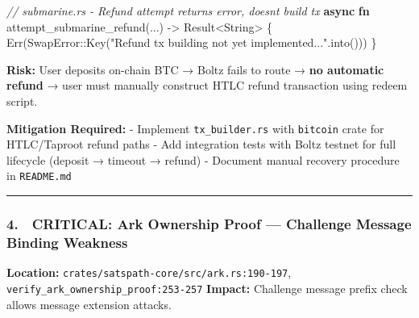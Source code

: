 \documentclass[
]{article}
\newenvironment{Shaded}{}{}
\newcommand{\CommentTok}[1]{\textcolor[rgb]{0.38,0.63,0.69}{\textit{#1}}}
\newcommand{\ConstantTok}[1]{\textcolor[rgb]{0.53,0.00,0.00}{#1}}
\newcommand{\DataTypeTok}[1]{\textcolor[rgb]{0.56,0.13,0.00}{#1}}
\newcommand{\KeywordTok}[1]{\textcolor[rgb]{0.00,0.44,0.13}{\textbf{#1}}}
\newcommand{\NormalTok}[1]{#1}
\newcommand{\OperatorTok}[1]{\textcolor[rgb]{0.40,0.40,0.40}{#1}}
\newcommand{\PreprocessorTok}[1]{\textcolor[rgb]{0.74,0.48,0.00}{#1}}
\newcommand{\StringTok}[1]{\textcolor[rgb]{0.25,0.44,0.63}{#1}}
\begin{document}
\begin{Shaded}
\begin{Highlighting}[]
\CommentTok{// submarine.rs {-} Refund attempt returns error, doesn\textquotesingle{}t build tx}
\KeywordTok{async} \KeywordTok{fn}\NormalTok{ attempt\_submarine\_refund(}\OperatorTok{...}\NormalTok{) }\OperatorTok{{-}\textgreater{}} \DataTypeTok{Result}\OperatorTok{\textless{}}\DataTypeTok{String}\OperatorTok{\textgreater{}} \OperatorTok{\{}
    \ConstantTok{Err}\NormalTok{(}\PreprocessorTok{SwapError::}\NormalTok{Key(}\StringTok{"Refund tx building not yet implemented..."}\OperatorTok{.}\NormalTok{into()))}
\OperatorTok{\}}
\end{Highlighting}
\end{Shaded}

\textbf{Risk:} User deposits on-chain BTC → Boltz fails to route →
\textbf{no automatic refund} → user must manually construct HTLC refund
transaction using redeem script.

\textbf{Mitigation Required:} - Implement \texttt{tx\_builder.rs} with
\texttt{bitcoin} crate for HTLC/Taproot refund paths - Add integration
tests with Boltz testnet for full lifecycle (deposit → timeout → refund)
- Document manual recovery procedure in \texttt{README.md}

\begin{center}\rule{0.5\linewidth}{0.5pt}\end{center}

\hypertarget{critical-ark-ownership-proof-challenge-message-binding-weakness}{%
\subsubsection{4. 🔴 CRITICAL: Ark Ownership Proof --- Challenge Message
Binding
Weakness}\label{critical-ark-ownership-proof-challenge-message-binding-weakness}}

\textbf{Location:} \texttt{crates/satspath-core/src/ark.rs:190-197},
\texttt{verify\_ark\_ownership\_proof:253-257} \textbf{Impact:}
Challenge message prefix check allows message extension attacks.
\end{document}
